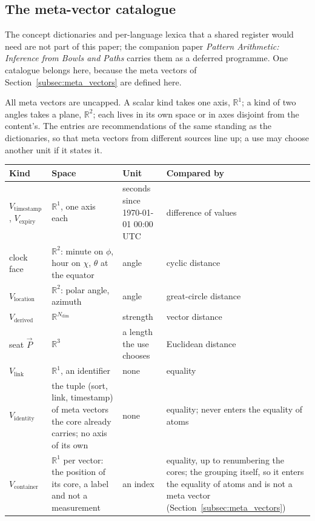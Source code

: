 \documentclass[12pt, a4paper]{article}
\begin{document}
\subsection{The meta-vector catalogue}
\label{subsec:meta_catalogue}
The concept dictionaries and per-language lexica that a shared register would need are not part of this paper; the companion paper \emph{Pattern Arithmetic: Inference from Bowls and Paths} carries them as a deferred programme. One catalogue belongs here, because the meta vectors of Section~\ref{subsec:meta_vectors} are defined here.

All meta vectors are uncapped. A scalar kind takes one axis, $\mathbb{R}^1$; a kind of two angles takes a plane, $\mathbb{R}^2$; each lives in its own space or in axes disjoint from the content's. The entries are recommendations of the same standing as the dictionaries, so that meta vectors from different sources line up; a use may choose another unit if it states it.
\begin{center}
\small
\begin{tabular}{@{}p{2.5cm}p{3.3cm}p{3.6cm}p{3.7cm}@{}}
\hline
Kind & Space & Unit & Compared by \\ \hline
$V_{\text{timestamp}}$, $V_{\text{expiry}}$ & $\mathbb{R}^1$, one axis each & seconds since 1970-01-01 00:00 UTC & difference of values \\
clock face & $\mathbb{R}^2$: minute on $\phi$, hour on $\chi$, $\theta$ at the equator & angle & cyclic distance \\
$V_{\text{location}}$ & $\mathbb{R}^2$: polar angle, azimuth & angle & great-circle distance \\
$V_{\text{derived}}$ & $\mathbb{R}^{N_{\mathrm{dim}}}$ & strength & vector distance \\
seat $\vec P$ & $\mathbb{R}^3$ & a length the use chooses & Euclidean distance \\
$V_{\text{link}}$ & $\mathbb{R}^1$, an identifier & none & equality \\
$V_{\text{identity}}$ & the tuple (sort, link, timestamp) of meta vectors the core already carries; no axis of its own & none & equality; never enters the equality of atoms \\
$V_{\text{container}}$ & $\mathbb{R}^1$ per vector: the position of its core, a label and not a measurement & an index & equality, up to renumbering the cores; the grouping itself, so it enters the equality of atoms and is not a meta vector (Section~\ref{subsec:meta_vectors}) \\ \hline
\end{tabular}
\end{center}
\end{document}
